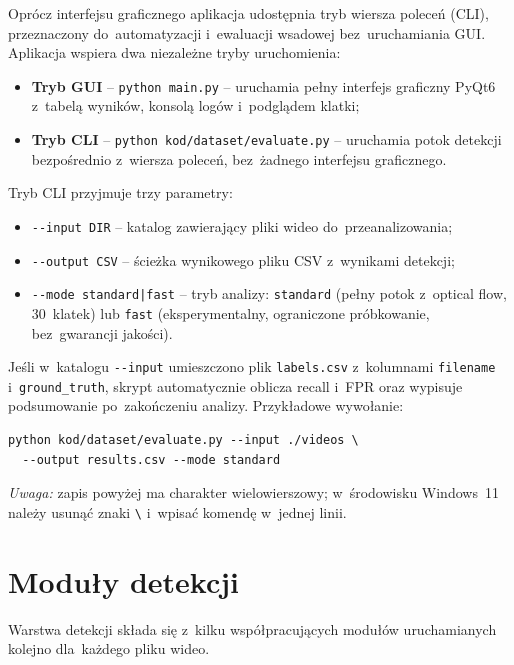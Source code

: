Oprócz interfejsu graficznego aplikacja udostępnia tryb wiersza poleceń (CLI),
przeznaczony do~automatyzacji i~ewaluacji wsadowej bez~uruchamiania GUI.
Aplikacja wspiera dwa niezależne tryby uruchomienia:

\begin{itemize}
  \item \textbf{Tryb GUI} -- \texttt{python main.py} -- uruchamia pełny interfejs
    graficzny PyQt6 z~tabelą wyników, konsolą logów i~podglądem klatki;
  \item \textbf{Tryb CLI} -- \texttt{python kod/dataset/evaluate.py} -- uruchamia
    potok detekcji bezpośrednio z~wiersza poleceń, bez~żadnego interfejsu graficznego.
\end{itemize}

Tryb CLI przyjmuje trzy parametry:
\begin{itemize}
  \item \texttt{-{}-input DIR} -- katalog zawierający pliki wideo do~przeanalizowania;
  \item \texttt{-{}-output CSV} -- ścieżka wynikowego pliku CSV z~wynikami detekcji;
  \item \texttt{-{}-mode standard|fast} -- tryb analizy: \texttt{standard} (pełny
    potok z~optical flow, 30~klatek) lub \texttt{fast} (eksperymentalny, ograniczone
    próbkowanie, bez~gwarancji jakości).
\end{itemize}

Jeśli w~katalogu \texttt{-{}-input} umieszczono plik \texttt{labels.csv}
z~kolumnami \texttt{filename} i~\texttt{ground\_truth}, skrypt automatycznie
oblicza recall i~FPR oraz wypisuje podsumowanie po~zakończeniu analizy.
Przykładowe wywołanie:

\begin{verbatim}
python kod/dataset/evaluate.py --input ./videos \
  --output results.csv --mode standard
\end{verbatim}

\noindent\textit{Uwaga:} zapis powyżej ma charakter wielowierszowy; w~środowisku
Windows~11 należy usunąć znaki \texttt{\textbackslash} i~wpisać komendę w~jednej linii.



\section{Moduły detekcji}

Warstwa detekcji składa się z~kilku współpracujących modułów
uruchamianych kolejno dla~każdego pliku wideo.

